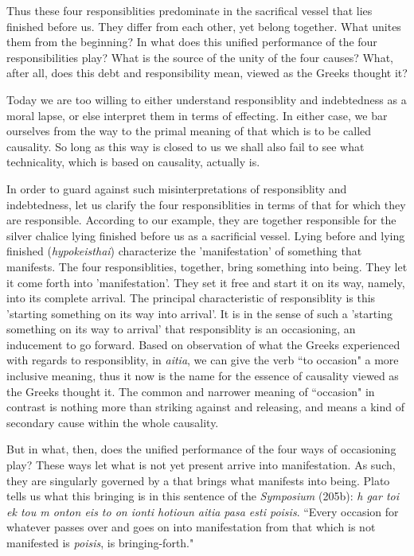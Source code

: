 Thus these four responsiblities predominate in the sacrifical vessel that lies finished before us. They differ from each other, yet belong together. What unites them from the beginning? In what does this unified performance of the four responsibilities play? What is the source of the unity of the four causes? What, after all, does this debt and responsibility mean, viewed as the Greeks thought it? 

Today we are too willing to either understand responsiblity and indebtedness as a moral lapse, or else interpret them in terms of effecting. In either case, we bar ourselves from the way to the primal meaning of that which is to be called causality. So long as this way is closed to us we shall also fail to see what technicality, which is based on causality, actually is.

In order to guard against such misinterpretations of responsiblity and indebtedness, let us clarify the four responsiblities in terms of that for which they are responsible. According to our example, they are together responsible for the silver chalice lying finished before us as a sacrificial vessel. Lying before and lying finished (\textit{hypokeisthai}) characterize the 'manifestation' of something that manifests. The four responsiblities, together, bring something into being. They let it come forth into 'manifestation'. They set it free and start it on its way, namely, into its complete arrival. The principal characteristic of responsiblity is this 'starting something on its way into arrival'. It is in the sense of such a 'starting something on its way to arrival' that responsiblity is an occasioning, an inducement to go forward. Based on observation of what the Greeks experienced with regards to responsiblity, in \textit{aitia}, we can give the verb ``to occasion" a more inclusive meaning, thus it now is the name for the essence of causality viewed as the Greeks thought it. The common and narrower meaning of ``occasion" in contrast is nothing more than striking against and releasing, and means a kind of secondary cause within the whole causality.

But in what, then, does the unified performance of the four ways of occasioning play? These ways let what is not yet present arrive into manifestation. As such, they are singularly governed by a  that brings what manifests into being. Plato tells us what this bringing is in this sentence of the \textit{Symposium} (205b): \textit{h gar toi ek tou m onton eis to on ionti hotioun aitia pasa esti poisis}. ``Every occasion for whatever passes over and goes on into manifestation from that which is not manifested is \textit{poisis}, is bringing-forth."

